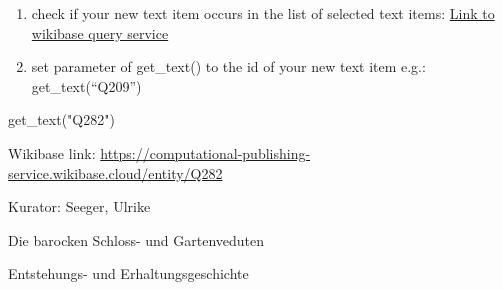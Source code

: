 \documentclass[
  a4paper,
]{book}
\newenvironment{Shaded}{\begin{snugshade}}{\end{snugshade}}
\newcommand{\NormalTok}[1]{\textcolor[rgb]{0.00,0.23,0.31}{#1}}
\newcommand{\StringTok}[1]{\textcolor[rgb]{0.13,0.47,0.30}{#1}}
\begin{document}
\begin{enumerate}
\def\labelenumi{\arabic{enumi}.}
\setcounter{enumi}{1}
\item
  check if your new text item occurs in the list of selected text items:
  \href{https://computational-publishing-service.wikibase.cloud/query/\#PREFIX\%20cps\%3A\%20\%3Chttps\%3A\%2F\%2Fcomputational-publishing-service.wikibase.cloud\%2Fentity\%2F\%3E\%0APREFIX\%20cpss\%3A\%20\%3Chttps\%3A\%2F\%2Fcomputational-publishing-service.wikibase.cloud\%2Fentity\%2Fstatement\%2F\%3E\%0APREFIX\%20cpsv\%3A\%20\%3Chttps\%3A\%2F\%2Fcomputational-publishing-service.wikibase.cloud\%2Fvalue\%2F\%3E\%0APREFIX\%20cpspt\%3A\%20\%3Chttps\%3A\%2F\%2Fcomputational-publishing-service.wikibase.cloud\%2Fprop\%2Fdirect\%2F\%3E\%0APREFIX\%20cpsp\%3A\%20\%3Chttps\%3A\%2F\%2Fcomputational-publishing-service.wikibase.cloud\%2Fprop\%2F\%3E\%0APREFIX\%20cpsps\%3A\%20\%3Chttps\%3A\%2F\%2Fcomputational-publishing-service.wikibase.cloud\%2Fprop\%2Fstatement\%2F\%3E\%0APREFIX\%20cpspq\%3A\%20\%3Chttps\%3A\%2F\%2Fcomputational-publishing-service.wikibase.cloud\%2Fprop\%2Fqualifier\%2F\%3E\%0A\%0ASELECT\%20\%3FtextItem\%20\%3FkuratorLabel\%20\%3FtextUrl\%0AWHERE\%0A\%7B\%0A\%20\%20\%3FtextItem\%20cpsp\%3AP46\%20\%3FkuratorStatement.\%20\%0A\%20\%20\%3FkuratorStatement\%20cpsps\%3AP46\%20\%3FkuratorItem.\%20\%0A\%20\%20\%3FkuratorItem\%20rdfs\%3Alabel\%20\%3FkuratorLabel.\%0A\%20\%20\%3FtextItem\%20cpsp\%3AP57\%20\%3Furlstatement.\%20\%0A\%20\%20\%3Furlstatement\%20cpsps\%3AP57\%20\%3FtextUrl.\%20\%0A\%7D}{Link
  to wikibase query service}
\item
  set parameter of get\_text() to the id of your new text item e.g.:
  get\_text(``Q209'')
\end{enumerate}

\begin{Shaded}
\begin{Highlighting}[]
\NormalTok{get\_text(}\StringTok{"Q282"}\NormalTok{)}
\end{Highlighting}
\end{Shaded}

Wikibase link:
\url{https://computational-publishing-service.wikibase.cloud/entity/Q282}

Kurator: Seeger, Ulrike

Die barocken Schloss- und Gartenveduten

Entstehungs- und Erhaltungsgeschichte
\end{document}
